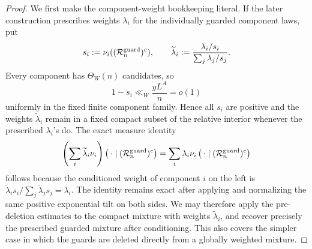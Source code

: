 \documentclass[11pt]{article}
\numberwithin{equation}{section}
\theoremstyle{definition}
\theoremstyle{remark}
\newcommand{\1}{\mathbf 1}
\begin{document}
\begin{proof}
We first make the component-weight bookkeeping literal.  If the later
construction prescribes weights \(\lambda_i\) for the individually
guarded component laws, put
\[
 s_i:=\nu_i((\mathcal R_n^{\rm guard})^c),\qquad
 \widetilde\lambda_i:=
 \frac{\lambda_i/s_i}{\sum_j\lambda_j/s_j}.
\]
Every component has \(\Theta_W(n)\) candidates, so
\[
 1-s_i\ll_W\frac{yL^A}{n}=o(1)
\]
uniformly in the fixed finite component family.  Hence all \(s_i\) are
positive and the weights \(\widetilde\lambda_i\) remain in a fixed compact
subset of the relative interior whenever the prescribed
\(\lambda_i\)'s do.  The exact measure identity
\begin{equation}
 \left(\sum_i\widetilde\lambda_i\nu_i\right)
       \left(\,\cdot\mid(\mathcal R_n^{\rm guard})^c\right)
 =\sum_i\lambda_i
       \nu_i\left(\,\cdot\mid(\mathcal R_n^{\rm guard})^c\right)
 \label{eq:marked-guard-component-weight-identity}
\end{equation}
follows because the conditioned weight of component \(i\) on the left is
\(\widetilde\lambda_is_i/\sum_j\widetilde\lambda_js_j=\lambda_i\).
The identity remains exact after applying and normalizing the same
positive exponential tilt on both sides.  We may therefore apply the
pre-deletion estimates to the compact mixture with weights
\(\widetilde\lambda_i\), and recover precisely the prescribed guarded
mixture after conditioning.  This also covers the simpler case in which
the guards are deleted directly from a globally weighted mixture.


\end{proof}
\end{document}

